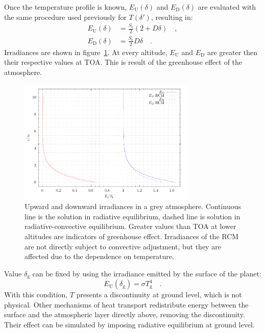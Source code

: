 \documentclass[a4paper,10pt,twocolumn,\classoptions]{article}
\begin{document}
Once the temperature profile is known, $E_\text{U}(\delta)$ and $E_\text{D}(\delta)$ are evaluated with the same procedure used previously for $T(\delta')$, resulting in:
\begin{align}
  \label{eq:irradiance_upward_solution}
  E_\text{U}(\delta) & = \frac{S_\text{t}}{2} (2 + D \delta) \quad , \\
  \label{eq:irradiance_downward_solution}
  E_\text{D}(\delta) & = \frac{S_\text{t}}{2} D \delta
  \quad .
\end{align}
Irradiances are shown in figure~\ref{fig:irradiance}. At every altitude, $E_\text{U}$ and $E_\text{D}$ are greater then their respective values at TOA. This is result of the greenhouse effect of the atmosphere.
\begin{figure}[h]
  \centering
  \includegraphics*[keepaspectratio=true,width=0.75\textwidth]{irradiance}
  \caption{Upward and downward irradiances in a grey atmosphere. Continuous line is the solution in radiative equilibrium, dashed line is solution in radiative-convective equilibrium. Greater values than TOA at lower altitudes are indicators of greenhouse effect. Irradiances of the RCM are not directly subject to convective adjustment, but they are affected due to the dependence on temperature.}
  \label{fig:irradiance}
\end{figure}

Value $\delta_\text{g}$ can be fixed by using the irradiance emitted by the surface of the planet:
\begin{equation}
  \label{eq:irradiance_upward_ground}
  E_\text{U}(\delta_\text{g}) = \sigma T_\text{g}^4
  \quad .
\end{equation}
With this condition, $T$ presents a discontinuity at ground level, which is not physical. Other mechanisms of heat transport redistribute energy between the surface and the atmospheric layer directly above, removing the discontinuity. Their effect can be simulated by imposing radiative equilibrium at ground level.
\end{document}
